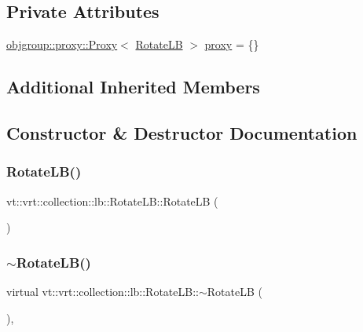 \subsection*{Private Attributes}
\begin{DoxyCompactItemize}
\item 
\hyperlink{structvt_1_1objgroup_1_1proxy_1_1_proxy}{objgroup\+::proxy\+::\+Proxy}$<$ \hyperlink{structvt_1_1vrt_1_1collection_1_1lb_1_1_rotate_l_b}{Rotate\+LB} $>$ \hyperlink{structvt_1_1vrt_1_1collection_1_1lb_1_1_rotate_l_b_aa181cbc42ae451bee43dacdddd708560}{proxy} = \{\}
\end{DoxyCompactItemize}
\subsection*{Additional Inherited Members}


\subsection{Constructor \& Destructor Documentation}
\mbox{\label{structvt_1_1vrt_1_1collection_1_1lb_1_1_rotate_l_b_a9cb675c68ec8794d6a2e284ece5de8a8}} 
\subsubsection{\texorpdfstring{Rotate\+L\+B()}{RotateLB()}}
{\footnotesize\ttfamily vt\+::vrt\+::collection\+::lb\+::\+Rotate\+L\+B\+::\+Rotate\+LB (\begin{DoxyParamCaption}{ }\end{DoxyParamCaption})\hspace{0.3cm}{\ttfamily [default]}}

\mbox{\label{structvt_1_1vrt_1_1collection_1_1lb_1_1_rotate_l_b_ae2a8e40cf47a9ea3be9d4ec6f44d9f50}} 
\subsubsection{\texorpdfstring{$\sim$\+Rotate\+L\+B()}{~RotateLB()}}
{\footnotesize\ttfamily virtual vt\+::vrt\+::collection\+::lb\+::\+Rotate\+L\+B\+::$\sim$\+Rotate\+LB (\begin{DoxyParamCaption}{ }\end{DoxyParamCaption})\hspace{0.3cm}{\ttfamily [inline]}, {\ttfamily [virtual]}}



